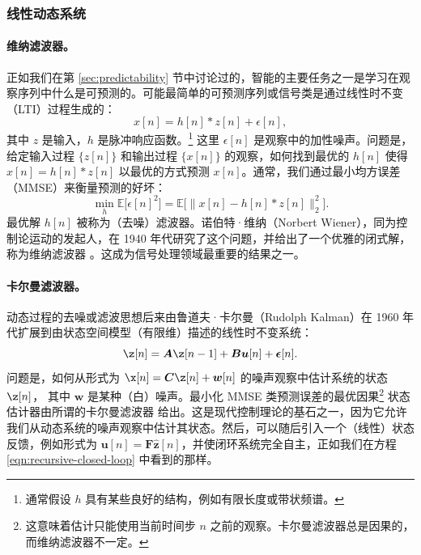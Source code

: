 \documentclass[../../book-main.tex]{subfiles}
\begin{document}

\subsubsection{线性动态系统}
\label{sec:linear-systems}

\paragraph{维纳滤波器。}

正如我们在第 \ref{sec:predictability} 节中讨论过的，智能的主要任务之一是学习在观察序列中什么是可预测的。可能最简单的可预测序列或信号类是通过线性时不变（LTI）过程生成的：
\begin{equation}
    x[n] = h[n]*z[n] + \epsilon[n], 
    \label{eqn:Wiener-model}
\end{equation}
其中 $z$ 是输入，$h$ 是脉冲响应函数。\footnote{通常假设 $h$ 具有某些良好的结构，例如有限长度或带状频谱。} 这里 $\epsilon[n]$ 是观察中的加性噪声。问题是，给定输入过程 $\{z[n]\}$ 和输出过程 $\{x[n]\}$ 的观察，如何找到最优的 $h[n]$ 使得 $\hat x[n] = h[n]*z[n]$ 以最优的方式预测 $x[n]$。通常，我们通过最小均方误差（MMSE）来衡量预测的好坏：
\begin{equation}
    \min_{h} \mathbb{E} \big[\epsilon[n]^2\big] = \mathbb{E} \big[\|x[n] - h[n]*z[n]\|_2^2\big].
\end{equation}
最优解 $h[n]$ 被称为（去噪）滤波器。诺伯特·维纳（Norbert Wiener），同为控制论运动的发起人，在 1940 年代研究了这个问题，并给出了一个优雅的闭式解，称为维纳滤波器 \cite{Wiener-1942,Wiener-1949}。这成为信号处理领域最重要的结果之一。

\paragraph{卡尔曼滤波器。} 
动态过程的去噪或滤波思想后来由鲁道夫·卡尔曼（Rudolph Kalman）在 1960 年代扩展到由状态空间模型（有限维）描述的线性时不变系统：
\begin{equation}
    \z[n] = \boldsymbol{A} \z[n-1] + \boldsymbol{B}\boldsymbol{u}[n] + \boldsymbol{\epsilon}[n]. 
    \label{eqn:linear-state-space}
\end{equation}
问题是，如何从形式为 $\x[n] = \boldsymbol{C} \z[n] + \boldsymbol{w}[n]$ 的噪声观察中估计系统的状态 $\z[n]$，
\label{eqn:Kalman-model}
其中 $\boldsymbol{w}$ 是某种（白）噪声。最小化 MMSE 类预测误差的最优因果\footnote{这意味着估计只能使用当前时间步 $n$ 之前的观察。卡尔曼滤波器总是因果的，而维纳滤波器不一定。} 状态估计器由所谓的卡尔曼滤波器 \cite{kalman1960new} 给出。这是现代控制理论的基石之一，因为它允许我们从动态系统的噪声观察中估计其状态。然后，可以随后引入一个（线性）状态反馈，例如形式为 $\boldsymbol{u}[n] = \boldsymbol{F} \hat{\boldsymbol{z}}[n]$，并使闭环系统完全自主，正如我们在方程 \eqref{eqn:recursive-closed-loop} 中看到的那样。
\end{document}
